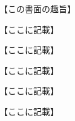 \documentclass{ltjsarticle}
\begin{document}
\maketitle

\SecZ{}

【この書面の趣旨】

\SecZ{}


\SecA{}

【ここに記載】

\SecB{}

【ここに記載】

\SecB{}

【ここに記載】

\SecB{}

【ここに記載】

\SecC{}

【ここに記載】

\Ijo
\end{document}
